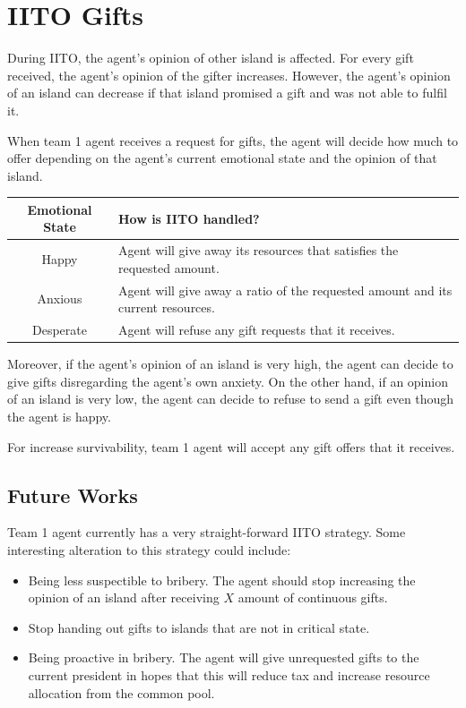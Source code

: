 \section{IITO Gifts}
During IITO, the agent's opinion of other island is affected. For every gift received, the agent's opinion of the gifter increases. However, the agent's opinion of an island can decrease if that island promised a gift and was not able to fulfil it. 

When team 1 agent receives a request for gifts, the agent will decide how much to offer depending on the agent's current emotional state and the opinion of that island. 

\begin{table} [htb]
    \centering
    \begin{tabular}{|c|p{}|}
        \hline
        Emotional State & How is IITO handled? \\
        \hline
        Happy & Agent will give away its resources that satisfies the requested amount. \\
        \hline
        Anxious & Agent will give away a ratio of the requested amount and its current resources. \\
        \hline
        Desperate & Agent will refuse any gift requests that it receives. \\ 
        \hline
    \end{tabular}
\end{table}

Moreover, if the agent's opinion of an island is very high, the agent can decide to give gifts disregarding the agent's own anxiety. On the other hand, if an opinion of an island is very low, the agent can decide to refuse to send a gift even though the agent is happy. 

For increase survivability, team 1 agent will accept any gift offers that it receives. 

\subsection{Future Works}
Team 1 agent currently has a very straight-forward IITO strategy. Some interesting alteration to this strategy could include:
\begin{itemize}
    \item Being less suspectible to bribery. The agent should stop increasing the opinion of an island after receiving $X$ amount of continuous gifts.
    \item Stop handing out gifts to islands that are not in critical state.
    \item Being proactive in bribery. The agent will give unrequested gifts to the current president in hopes that this will reduce tax and increase resource allocation from the common pool. 
\end{itemize}

